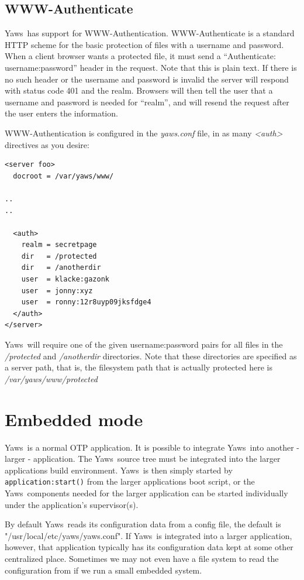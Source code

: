 \documentclass[11pt,oneside,english]{book}
\newcommand{\Yaws}            %
        {{\sc Yaws}}
\begin{document}
\section{WWW-Authenticate}
\Yaws\  has support for WWW-Authentication.   WWW-Authenticate is a
standard HTTP scheme for the basic protection of files with a username
and password.  When a client browser wants a protected file, it must send a
``Authenticate: username:password'' header in the request.  Note that
this is plain text.   If there is no such header or the username and
password is invalid the server will respond with status code 401 and
the realm.  Browsers will then tell the user that a username and
password is needed for ``realm'',  and will resend the request after
the user enters the information.

WWW-Authentication is configured in the \textit{yaws.conf} file, in as
many \textit{<auth>} directives as you desire:

\begin{verbatim}
<server foo>
  docroot = /var/yaws/www/

..
..

  <auth>
    realm = secretpage
    dir   = /protected
    dir   = /anotherdir
    user  = klacke:gazonk
    user  = jonny:xyz
    user  = ronny:12r8uyp09jksfdge4
  </auth>
</server>
\end{verbatim}


\Yaws\  will require one of the given username:password pairs for all
files in the \textit{/protected} and \textit{/anotherdir} directories.
Note that these directories are specified as a server path,  that is,
the filesystem path that is actually protected here is
\textit{/var/yaws/www/protected}


\chapter {Embedded mode}

\Yaws\  is a normal OTP application. It is possible to integrate \Yaws\
into another - larger - application. The \Yaws\  source tree must be
integrated into the larger applications build environment. \Yaws\  is
then simply started by \verb+application:start()+ from the larger
applications boot script, or the \Yaws\  components needed for the
larger application can be started individually under the application's
supervisor(s).

By default \Yaws\ reads its configuration data from a config file, the
default is "/usr/local/etc/yaws/yaws.conf". If \Yaws\ is integrated
into a larger application, however, that application typically has its
configuration data kept at some other centralized place. Sometimes we
may not even have a file system to read the configuration from if we
run a small embedded system.
\end{document}
